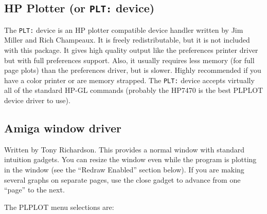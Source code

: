 \subsection{HP Plotter (or {\tt PLT:} device)}

The {\tt PLT:} device is an HP plotter compatible device handler written by
Jim Miller and Rich Champeaux.  It is freely redistributable, but it is not
included with this package.  It gives high quality output like the
preferences printer driver but with full preferences support.  Also, it
usually requires less memory (for full page plots) than the preferences
driver, but is slower.  Highly recommended if you have a color printer or
are memory strapped.  The {\tt PLT:} device accepts virtually all of the
standard HP-GL commands (probably the HP7470 is the best PLPLOT device
driver to use).

\subsection{Amiga window driver}

Written by Tony Richardson.  This provides a normal window with standard
intuition gadgets.  You can resize the window even while the program is
plotting in the window (see the ``Redraw Enabled'' section below).  If you
are making several graphs on separate pages, use the close gadget to
advance from one ``page'' to the next. 

The PLPLOT menu selections are:

